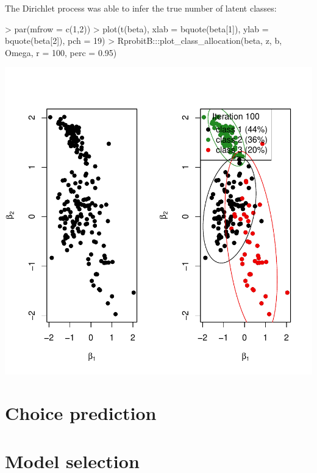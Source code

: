 \documentclass[article]{jss}
\begin{document}
\begin{Schunk}
\end{Schunk}

The Dirichlet process was able to infer the true number  of latent classes:

\begin{Schunk}
\begin{Sinput}
> par(mfrow = c(1,2))
> plot(t(beta), xlab = bquote(beta[1]), ylab = bquote(beta[2]), pch = 19)
> RprobitB:::plot_class_allocation(beta, z, b, Omega, r = 100, perc = 0.95)
\end{Sinput}
\end{Schunk}
\includegraphics{rprobitb_oelschlaeger_bauer-dirichlet-example-plot}

\section{Choice prediction} \label{sec:choice_prediction}

\section{Model selection} \label{sec:model_selection}
\end{document}
